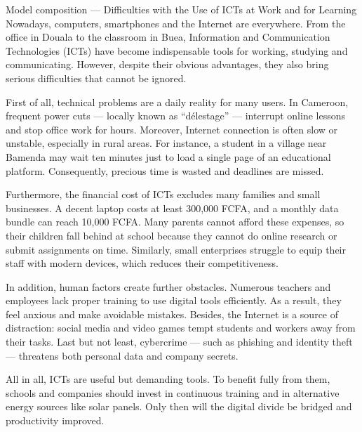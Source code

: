 \documentclass[11pt]{article}
\newcounter{popsec}
\newcounter{popsub}
\newcommand{\courssub}[1]{%
  \stepcounter{popsub}%
  \par\vspace{9pt}\noindent{\popxbold\fontsize{11.5}{13}\selectfont\color{popink}{\color{poporange}\thepopsec.\thepopsub}\hspace{6pt}#1}\par\nopagebreak\vspace{4pt}
}
\begin{document}
\courssub{Reading the model essay}

\begin{textebox}{Model composition — Difficulties with the Use of ICTs at Work and for Learning}
Nowadays, computers, smartphones and the Internet are everywhere. From the office in Douala to the classroom in Buea, Information and Communication Technologies (ICTs) have become indispensable tools for working, studying and communicating. However, despite their obvious advantages, they also bring serious difficulties that cannot be ignored.

First of all, technical problems are a daily reality for many users. In Cameroon, frequent power cuts — locally known as “délestage” — interrupt online lessons and stop office work for hours. Moreover, Internet connection is often slow or unstable, especially in rural areas. For instance, a student in a village near Bamenda may wait ten minutes just to load a single page of an educational platform. Consequently, precious time is wasted and deadlines are missed.

Furthermore, the financial cost of ICTs excludes many families and small businesses. A decent laptop costs at least 300,000 FCFA, and a monthly data bundle can reach 10,000 FCFA. Many parents cannot afford these expenses, so their children fall behind at school because they cannot do online research or submit assignments on time. Similarly, small enterprises struggle to equip their staff with modern devices, which reduces their competitiveness.

In addition, human factors create further obstacles. Numerous teachers and employees lack proper training to use digital tools efficiently. As a result, they feel anxious and make avoidable mistakes. Besides, the Internet is a source of distraction: social media and video games tempt students and workers away from their tasks. Last but not least, cybercrime — such as phishing and identity theft — threatens both personal data and company secrets.

All in all, ICTs are useful but demanding tools. To benefit fully from them, schools and companies should invest in continuous training and in alternative energy sources like solar panels. Only then will the digital divide be bridged and productivity improved.
\end{textebox}
\end{document}
